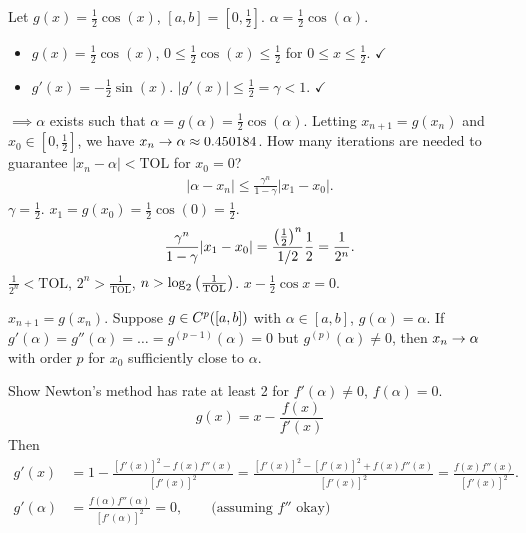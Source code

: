 \documentclass[]{article}
\begin{document}
\begin{example}
	Let $g(x) = \frac12\cos(x)$, $[a,b] = [0,\frac12]$.
	$\alpha = \frac12\cos(\alpha)$.
	\begin{itemize}
		\item $g(x) = \frac12\cos(x)$, $0\leq\frac12\cos(x)\leq\frac12$ for $0\leq x\leq\frac12$. $\checkmark$
		\item $g'(x) = -\frac12\sin(x)$. $|g'(x)|\leq\frac12=\gamma<1$. $\checkmark$
	\end{itemize}
	$\implies \alpha$ exists such that $\alpha = g(\alpha) = \frac12\cos(\alpha)$.
	Letting $x_{n+1}=g(x_n)$ and $x_0\in[0,\frac12]$, we have $x_n\rightarrow\alpha\approx 0.450184$.
	How many iterations are needed to guarantee $|x_n-\alpha|<\text{TOL}$ for $x_0=0$?
	\begin{align*}
		|\alpha - x_n| \leq \frac{\gamma^n}{1-\gamma}|x_1-x_0|.
	\end{align*}
	$\gamma=\frac12$. $x_1 = g(x_0) = \frac12\cos(0) = \frac12$.
	$$ \frac{\gamma^n}{1-\gamma}|x_1-x_0| = \frac{\left(\frac12\right)^n}{1/2}\frac12 = \frac1{2^n}.$$
	$\frac1{2^n} < \text{TOL}$, $2^n > \frac1{\text{TOL}}$, $n>\log_2\left(\frac1{\text{TOL}}\right)$.
	$ x-\frac12\cos x=0$.
\end{example}

\begin{theorem}
	[rate] $x_{n+1} = g(x_n)$.
	Suppose $g\in C^{p}({[}a,b{]})$ with $\alpha\in[a,b]$, $g(\alpha)=\alpha$.
	If $g'(\alpha)=g''(\alpha)=\dots=g^{(p-1)}(\alpha)=0$ but $g^{(p)}(\alpha)\neq0$, then $x_n\rightarrow\alpha$ with order $p$ for $x_0$ sufficiently close to $\alpha$.
\end{theorem}

\begin{example}
	Show Newton's method has rate at least 2 for $f'(\alpha)\neq0$, $f(\alpha)=0$.
	$$ g(x) = x-\frac{f(x)}{f'(x)} $$
	Then \begin{align*}
		g'(x) &= 1- \frac{[f'(x)]^2-f(x)f''(x)}{[f'(x)]^2}
			  = \frac{[f'(x)]^2-[f'(x)]^2+f(x)f''(x)}{[f'(x)]^2}
			  = \frac{f(x)f''(x)}{[f'(x)]^2}. \\
		g'(\alpha) &= \frac{f(\alpha)f''(\alpha)}{[f'(\alpha)]^2} = 0, \qquad \text{(assuming $f''$ okay)}
	\end{align*}
\end{example}
\end{document}
